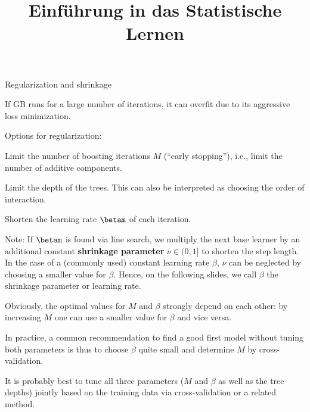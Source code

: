 






\newcommand{\titlefigure}{figure/gbm_sine_title}
\newcommand{\learninggoals}{
  \item Learn about three main regularization options: number of iterations,
  tree depth and shrinkage
  \item Understand how regularization influences model fit
}

\title{Einführung in das Statistische Lernen}
\date{}






\begin{vbframe}{Regularization and shrinkage}

If GB runs for a large number of iterations, it can overfit due to its aggressive loss
minimization.

\begin{blocki}{Options for regularization:}
\item Limit the number of boosting iterations $M$ (\enquote{early stopping}), i.e., limit the number of additive components.
\item Limit the depth of the trees. This can also be interpreted as choosing the order of interaction.
\item Shorten the learning rate $\betam$ of each iteration.
\end{blocki}


Note: If $\betam$ is found via line search, we multiply the next base learner by an additional constant \textbf{shrinkage parameter} $\nu \in (0,1]$ to shorten the step length.
In the case of a (commonly used) constant learning rate $\beta$, $\nu$ can be neglected by choosing a smaller value for $\beta$.
Hence, on the following slides, we call $\beta$ the shrinkage parameter or learning rate.


\framebreak

Obviously, the optimal values for $M$ and $\beta$ strongly depend on each other:
by increasing $M$ one can use a smaller value for $\beta$ and vice versa.

\lz

In practice, a common recommendation to find a good first model without tuning both parameters is thus to choose $\beta$ quite small and determine $M$ by cross-validation.

\lz

It is probably best to tune all three parameters ($M$ and $\beta$ as well as
the tree depths) jointly based on the training data
via cross-validation or a related method.

\end{vbframe}

